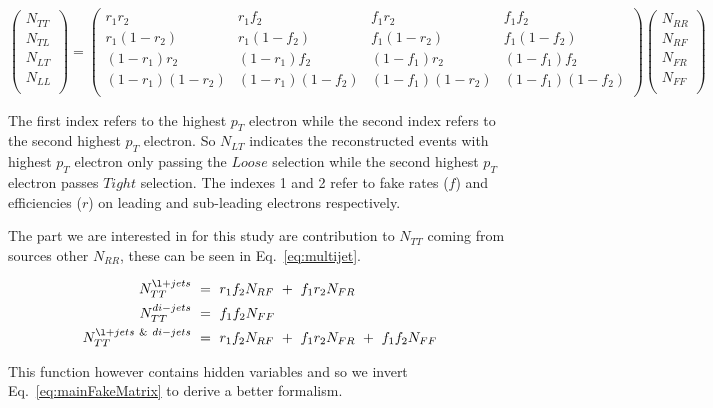 \begin{equation} \label{eq:mainFakeMatrix}
   \begin{pmatrix}
      N_{TT} \\
      N_{TL} \\
      N_{LT} \\
      N_{LL} \\
   \end{pmatrix}
   =
   \begin{pmatrix}
      r_{1}r_{2} & r_{1}f_{2} & f_{1}r_{2} & f_{1}f_{2} \\
      r_{1}(1-r_{2}) & r_{1}(1-f_{2}) & f_{1}(1-r_{2}) & f_{1}(1-f_{2}) \\
      (1-r_{1})r_{2} & (1-r_{1})f_{2} & (1-f_{1})r_{2} & (1-f_{1})f_{2} \\
      (1-r_{1})(1-r_{2}) & (1-r_{1})(1-f_{2}) & (1-f_{1})(1-r_{2}) & (1-f_{1})(1-f_{2}) \\
   \end{pmatrix}
   \begin{pmatrix}
      N_{RR} \\
      N_{RF} \\
      N_{FR} \\
      N_{FF} \\
   \end{pmatrix}
\end{equation}

The first index refers to the highest $p_{T}$ electron while the second index refers to the second highest $p_{T}$ electron. So $N_{LT}$ indicates the reconstructed events with highest $p_{T}$ electron only passing the $Loose$ selection while the second highest $p_{T}$ electron passes $Tight$ selection. The indexes 1 and 2 refer to fake rates ($f$) and efficiencies ($r$) on leading and sub-leading electrons respectively.

The part we are interested in for this study are contribution to $N_{TT}$ coming from sources other $N_{RR}$, these can be seen in Eq.~\ref{eq:multijet}.

\begin{align} \label{eq:multijet}
   N^{\l+jets}_{TT}~&=~r_{1}f_{2}N_{RF}~+~f_{1}r_{2}N_{FR} \nonumber \\
   N^{di-jets}_{TT}~&=~f_{1}f_{2}N_{FF} \nonumber \\
   N^{\l+jets~\&~di-jets}_{TT}~&=~r_{1}f_{2}N_{RF}~+~f_{1}r_{2}N_{FR}~+~f_{1}f_{2}N_{FF} 
\end{align}

This function however contains hidden variables and so we invert Eq.~\ref{eq:mainFakeMatrix} to derive a better formalism.

